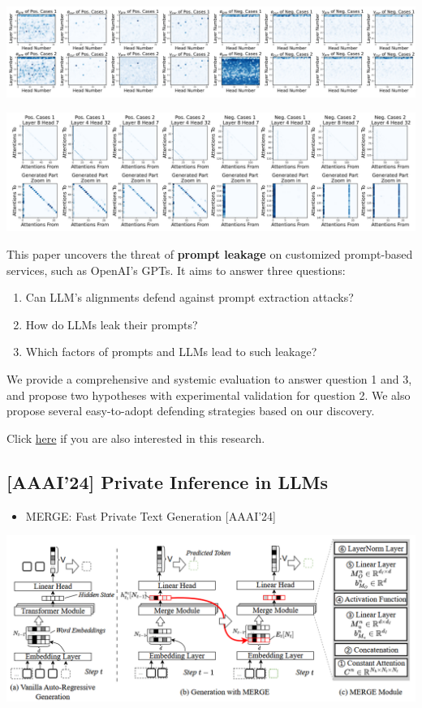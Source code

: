 \documentclass[11pt]{article}
\begin{document}
\begin{center}
\includegraphics[width=.9\linewidth]{./images/screenshot_20250309_221310.png}
\end{center}

\begin{center}
\includegraphics[width=.9\linewidth]{./images/screenshot_20250309_221323.png}
\end{center}

This paper uncovers the threat of \textbf{prompt leakage} on customized prompt-based services, such as OpenAI's GPTs. It aims to answer three questions:
\begin{enumerate}
\item Can LLM's alignments defend against prompt extraction attacks?
\item How do LLMs leak their prompts?
\item Which factors of prompts and LLMs lead to such leakage?
\end{enumerate}


We provide a comprehensive and systemic evaluation to answer question 1 and 3, and propose two hypotheses with experimental validation for question 2. We also propose several easy-to-adopt defending strategies based on our discovery.

Click \href{https://arxiv.org/abs/2408.02416}{here} if you are also interested in this research.
\subsection{{[}AAAI'24] Private Inference in LLMs}
\label{sec:org0db8490}
\begin{itemize}
\item MERGE: Fast Private Text Generation [AAAI'24]
\end{itemize}

\begin{center}
\includegraphics[width=.9\linewidth]{./images/screenshot_20250309_221412.png}
\end{center}
\end{document}
